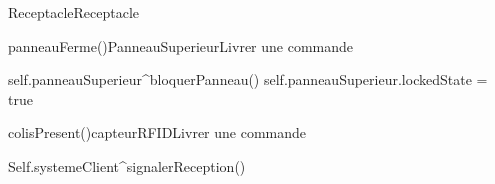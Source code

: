 \begin{OM}{Receptacle}{Receptacle}
    \begin{OMOperation}{panneauFerme()}{PanneauSuperieur}{Livrer une commande}
        \begin{OMMessages}
        \end{OMMessages}
        \OMNoPre
        \begin{OMPost}
            self.panneauSuperieur^bloquerPanneau()
            self.panneauSuperieur.lockedState = true
        \end{OMPost}
    \end{OMOperation}

    \begin{OMOperation}{colisPresent()}{capteurRFID}{Livrer une commande}
        \begin{OMMessages}
        \end{OMMessages}
        \OMNoPre
        \begin{OMPost}
            Self.systemeClient^signalerReception()
        \end{OMPost}
    \end{OMOperation}
\end{OM}
